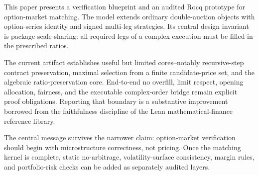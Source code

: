 \documentclass[11pt]{article}
\begin{document}
This paper presents a verification blueprint and an audited Rocq prototype for option-market matching. The model extends ordinary double-auction objects with option-series identity and signed multi-leg strategies. Its central design invariant is package-scale sharing: all required legs of a complex execution must be filled in the prescribed ratios.

The current artifact establishes useful but limited cores--notably recursive-step contract preservation, maximal selection from a finite candidate-price set, and the algebraic ratio-preservation core. End-to-end no overfill, limit respect, opening allocation, fairness, and the executable complex-order bridge remain explicit proof obligations. Reporting that boundary is a substantive improvement borrowed from the faithfulness discipline of the Lean mathematical-finance reference library.

The central message survives the narrower claim: option-market verification should begin with microstructure correctness, not pricing. Once the matching kernel is complete, static no-arbitrage, volatility-surface consistency, margin rules, and portfolio-risk checks can be added as separately audited layers.
\end{document}
